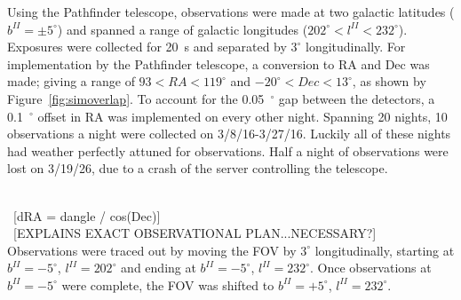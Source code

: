\documentclass[aps,prb,twocolumn,superscriptaddress]{revtex4-1}
\begin{document}
Using the Pathfinder telescope, observations were made at two galactic latitudes ($b^{II}=\pm5^{\circ}$) and spanned a range of galactic longitudes ($202^{\circ} < l^{II} < 232^{\circ}$).  
Exposures were collected for 20~s and separated by $3^{\circ}$ longitudinally.  For implementation by the Pathfinder telescope, a conversion to RA and Dec was made; giving a range of $93 < RA < 119^{\circ}$ and $-20^{\circ} < Dec < 13^{\circ}$, as shown by Figure~\ref{fig:simoverlap}.  To account for the 0.05~$^{\circ}$ gap between the detectors, a 0.1~$^{\circ}$ offset in RA was implemented on every other night.  
Spanning 20 nights, 10 observations a night were collected on 3/8/16-3/27/16.  Luckily all of these nights had weather perfectly attuned for observations.  Half a night of observations were lost on 3/19/26, due to a crash of the server controlling the telescope.


~\\~[dRA = dangle / cos(Dec)]
~\\~[EXPLAINS EXACT OBSERVATIONAL PLAN...NECESSARY?]\\
Observations were traced out by moving the FOV by $3^{\circ}$ longitudinally, starting at $b^{II}=-5^{\circ}$, $l^{II}=202^{\circ}$ and ending at $b^{II}=-5^{\circ}$, $l^{II}=232^{\circ}$.  Once observations at $b^{II}=-5^{\circ}$ were complete, the FOV was shifted to $b^{II}=+5^{\circ}$, $l^{II}=232^{\circ}$.


\end{document}
